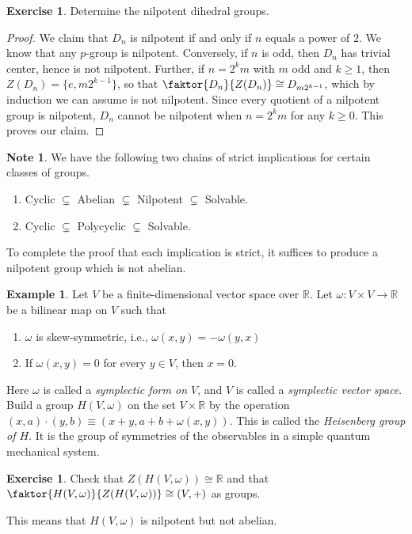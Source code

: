 \documentclass[10pt,letterpaper,cm]{nupset}
\theoremstyle{definition}
\newtheorem{exmp}[definition]{Example}
\newtheorem{note}[definition]{Note}
\theoremstyle{theorem}
\newtheorem{exercise}[definition]{Exercise}
\theoremstyle{remark}
\newcommand{\R}{\mathbb R}
\newcommand{\1}{\mathbf{1}}
\newcommand{\0}{\vec 0}
\begin{document}
\begin{exercise}
Determine the nilpotent dihedral groups. 
\end{exercise}
\begin{proof}
We claim that $D_n$ is nilpotent  if and only if $n$ equals a power of $2$. We know that any $p$-group is nilpotent. Conversely, if $n$ is odd, then $D_n$ has trivial center, hence is not nilpotent. Further, if $n= 2^km$ with $m$ odd and $k\geq 1$, then $Z(D_n) = \{e, m2^{k-1}\}$, so that $\faktor{D_n}{Z(D_n)} \cong D_{m2^{k-1}}$, which by induction we can assume is not nilpotent. Since every quotient of a nilpotent group is nilpotent, $D_n$ cannot be nilpotent when $n = 2^km$ for any $k\geq 0$. This proves our claim.
\end{proof}

\begin{note}\label{r10}
 We have the following two chains of strict implications for certain classes of groups.
\begin{enumerate}[label=(\roman*)]
\item Cyclic $\subsetneq$ Abelian $\subsetneq$ Nilpotent $\subsetneq$ Solvable.
\item Cyclic $\subsetneq$ Polycyclic $\subsetneq$  Solvable.
\end{enumerate}
\end{note}


To complete the proof that each implication is strict, it suffices to produce a nilpotent group which is not abelian.


\begin{exmp}
Let $V$ be a finite-dimensional vector space over $\R$. Let $\omega: V\times V\to \R$ be a bilinear map on $V$ such that
\begin{enumerate}[label=(\alph*)]
\item $\omega$ is skew-symmetric, i.e., $\omega(x,y) = {-\omega(y,x)}$
\item If $\omega(x,y) =0$ for every $y \in V$, then $x=0$.
\end{enumerate}
Here $\omega$ is called a \textit{symplectic form on $V$}, and $V$ is called a \textit{symplectic vector space}. Build a group $H(V, \omega)$ on the set $V \times \R$ by the operation $(x,a)\cdot(y,b) \equiv \left(x+y, a+b + \omega(x,y)\right)$. This is called the \textit{Heisenberg group of $H$}. It is the group of symmetries of the observables in a simple quantum mechanical system. 

\begin{exercise} 
Check that $Z(H(V, \omega)) \cong \R$ and that $\faktor{H(V, \omega)}{Z(H(V, \omega))} \cong \left(V, +\right)$ as groups. 
\end{exercise}
This means that $H(V, \omega)$ is nilpotent but not abelian.
\end{exmp}
\end{document}
